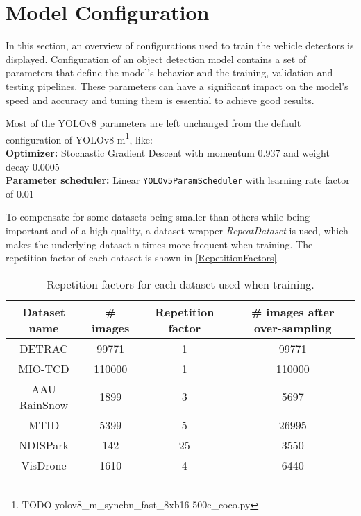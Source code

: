 

\section{Model Configuration}

In this section, an overview of configurations used to train the vehicle
detectors is displayed. Configuration of an object detection model contains a
set of parameters that define the model's behavior and the training, validation
and testing pipelines. These parameters can have a significant impact on the
model's speed and accuracy and tuning them is essential to achieve good results.

Most of the YOLOv8 parameters are left unchanged from the default configuration
of YOLOv8-m\footnote{TODO yolov8\_m\_syncbn\_fast\_8xb16-500e\_coco.py}, like: \\
\textbf{Optimizer:} Stochastic Gradient Descent with momentum \num{0.937} and weight decay \num{0.0005} \\
\textbf{Parameter scheduler:} Linear \verb|YOLOv5ParamScheduler| with learning rate factor of 0.01

To compensate for some datasets being smaller than others while being important
and of a high quality, a dataset wrapper \textit{RepeatDataset} is used, which
makes the underlying dataset n-times more frequent when training. The repetition
factor of each dataset is shown in \autoref{RepetitionFactors}.

\begin{table}[h]
\centering
\label{RepetitionFactors}
\small
\begin{tabular}{|c|c|c|c|}
    \hline
    Dataset name & \# images & Repetition factor & \# images after over-sampling \\
    \hline
    DETRAC       &  \num{99771} &  1 & \num{99771} \\
    MIO-TCD      & \num{110000} &  1 & \num{110000} \\
    AAU RainSnow &   \num{1899} &  3 & \num{5697} \\
    MTID         &   \num{5399} &  5 & \num{26995} \\
    NDISPark     &    \num{142} & 25 & \num{3550} \\
    VisDrone     &   \num{1610} &  4 & \num{6440} \\
    \hline
\end{tabular}
\caption{Repetition factors for each dataset used when training.}
\end{table}

